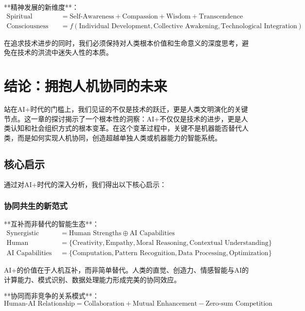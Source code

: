 **精神发展的新维度**：
\begin{align}
\text{Spiritual Growth} &= \text{Self-Awareness} + \text{Compassion} + \text{Wisdom} + \text{Transcendence} \\
\text{Consciousness Evolution} &= f(\text{Individual Development}, \text{Collective Awakening}, \text{Technological Integration})
\end{align}

\begin{center}
在追求技术进步的同时，我们必须保持对人类根本价值和生命意义的深度思考，避免在技术的洪流中迷失人性的本质。
\end{center}

\section{结论：拥抱人机协同的未来}

站在AI+时代的门槛上，我们见证的不仅是技术的跃迁，更是人类文明演化的关键节点。这一章的探讨揭示了一个根本性的洞察：AI+不仅仅是技术的进步，更是人类认知和社会组织方式的根本变革。在这个变革过程中，关键不是机器能否替代人类，而是如何实现人机协同，创造超越单独人类或机器能力的智能系统。

\subsection{核心启示} %

通过对AI+时代的深入分析，我们得出以下核心启示：

\subsubsection{协同共生的新范式} %

**互补而非替代的智能生态**：
\begin{align}
\text{Synergistic Intelligence} &= \text{Human Strengths} \oplus \text{AI Capabilities} \\
\text{Human Strengths} &= \{\text{Creativity}, \text{Empathy}, \text{Moral Reasoning}, \text{Contextual Understanding}\} \\
\text{AI Capabilities} &= \{\text{Computation}, \text{Pattern Recognition}, \text{Data Processing}, \text{Optimization}\}
\end{align}

AI+的价值在于人机互补，而非简单替代。人类的直觉、创造力、情感智能与AI的计算能力、模式识别、数据处理能力形成完美的协同效应。

**协同而非竞争的关系模式**：
\begin{equation}
\text{Human-AI Relationship} = \text{Collaboration} + \text{Mutual Enhancement} - \text{Zero-sum Competition}
\end{equation}

